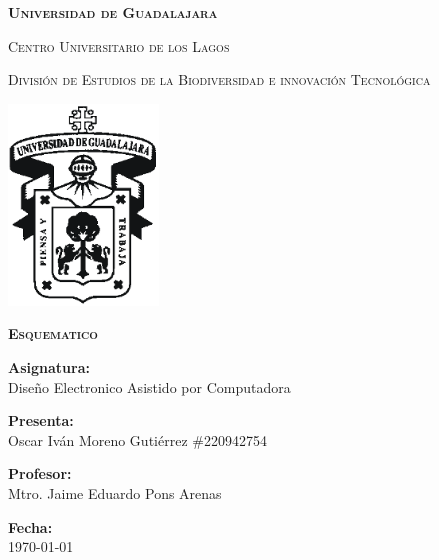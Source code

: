 \documentclass[12pt]{report}
\begin{document}
\setlength{\hoffset}{27 pt} %
\begin{titlepage}
{\centering
{\scshape\bfseries\fontsize{29.16}{34.992}\selectfont Universidad de Guadalajara \par}
\vspace{0.5cm}
{\scshape\Large Centro Universitario de los Lagos \par}
\vspace{1cm}
{\scshape\Large División de Estudios de la Biodiversidad e innovación Tecnológica \par}
\vspace{1cm}
{\graphicspath{{imagenes/Portada}} %
\includegraphics[width=0.3\textwidth]{image.png}\par}
\vspace{1cm}
{\scshape\large\bfseries Esquematico \par}
\vspace{1.5cm}
{\large \textbf{Asignatura:} \\Diseño Electronico Asistido por Computadora\par}
\vfill
{\large \textbf{Presenta:} \\Oscar Iván Moreno Gutiérrez \#220942754\par}
\vfill
{\large \textbf{Profesor:} \\Mtro. Jaime Eduardo Pons Arenas \par}
\vfill
\vfill
\begin{flushright}
  {\normalsize \textbf {Fecha:} \\ \today}
\end{flushright}
\vfill}
{\large  \par}
\end{titlepage}

\tableofcontents
\newpage
\end{document}
